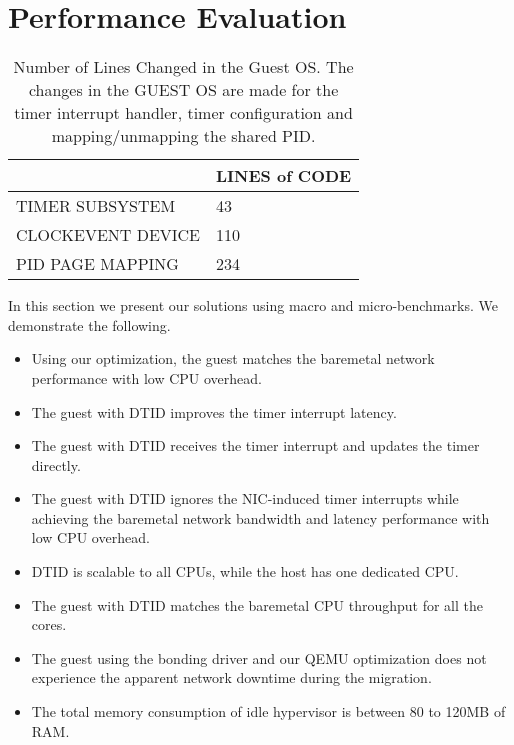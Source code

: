 \section{Performance Evaluation}
\begin{table}[tbp]
\begin{tabular}{|l|l|}
\hline
& LINES of CODE \\ \hline
TIMER SUBSYSTEM & 43 \\ \hline
CLOCKEVENT DEVICE & 110 \\ \hline
PID PAGE MAPPING & 234 \\ \hline
\end{tabular}
\caption{Number of Lines Changed in the Guest OS. The changes
in the GUEST OS are made for the timer interrupt handler,
timer configuration and mapping/unmapping the shared PID.}
\label{tab:guest_os_changes}
\end{table}

In this section we present our solutions using macro
and micro-benchmarks. We demonstrate the following.
\begin{itemize}
  \item Using our optimization, the guest matches the
  baremetal network performance with low CPU overhead.
  \item The guest with DTID improves the timer interrupt
  latency.
  \item The guest with DTID receives the timer interrupt and
  updates the timer directly.
  \item The guest with DTID ignores the NIC-induced timer
  interrupts while achieving the baremetal network bandwidth
  and latency performance with low CPU overhead.
  \item DTID is scalable to all CPUs, while the host has one
  dedicated CPU.
  \item The guest with DTID matches the baremetal CPU
  throughput for all the cores.
  \item The guest using the bonding driver and our QEMU
  optimization does not experience the apparent network
  downtime during the migration.
  \item The total memory consumption of idle hypervisor is
  between 80 to 120MB of RAM.
\end{itemize}

